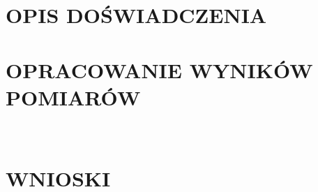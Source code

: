 \documentclass{article}
\begin{document}
\section*{OPIS DOŚWIADCZENIA}

{

}

\section*{OPRACOWANIE WYNIKÓW POMIARÓW}

{

}\\





\section*{WNIOSKI}

{

}
\end{document}
